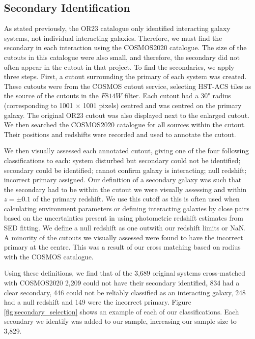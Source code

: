 \documentclass[fleqn,usenatbib]{mnras}
\begin{document}
\subsection{Secondary Identification}
\noindent As stated previously, the OR23 catalogue only identified interacting galaxy systems, not individual interacting galaxies. Therefore, we must find the secondary in each interaction using the COSMOS2020 catalogue. The size of the cutouts in this catalogue were also small, and therefore, the secondary did not often appear in the cutout in that project. To find the secondaries, we apply three steps. First, a cutout surrounding the primary of each system was created. These cutouts were from the COSMOS cutout service, selecting HST-ACS tiles as the source of the cutouts in the $F814W$ filter. Each cutout had a 30" radius (corresponding to 1001 $\times$ 1001 pixels) centred and was centred on the primary galaxy. The original OR23 cutout was also displayed next to the enlarged cutout. We then searched the COSMOS2020 catalogue for all sources within the cutout. Their positions and redshifts were recorded and used to annotate the cutout.

We then visually assessed each annotated cutout, giving one of the four following classifications to each: system disturbed but secondary could not be identified; secondary could be identified; cannot confirm galaxy is interacting; null redshift; incorrect primary assigned. Our definition of a secondary galaxy was such that the secondary had to be within the cutout we were visually assessing and within $z=\pm0.1$ of the primary redshift. We use this cutoff as this is often used when calculating environment parameters \citep[e.g][]{Baldry 2006} or defining interacting galaxies by close pairs \citep[e.g][]{Shah et al. paper from 2022 / 2023} based on the uncertainties present in using photometric redshift estimates from SED fitting. We define a null redshift as one outwith our redshift limits or NaN. A minority of the cutouts we visually assessed were found to have the incorrect primary at the centre. This was a result of our cross matching based on radius with the COSMOS catalogue. 

Using these definitions, we find that of the 3,689 original systems cross-matched with COSMOS2020 2,209 could not have their secondary identified, 834 had a clear secondary, 446 could not be reliably classified as an interacting galaxy, 248 had a null redshift and 149 were the incorrect primary. Figure \ref{fig:secondary_selection} shows an example of each of our classifications. Each secondary we identify was added to our sample, increasing our sample size to 3,829.
\end{document}

